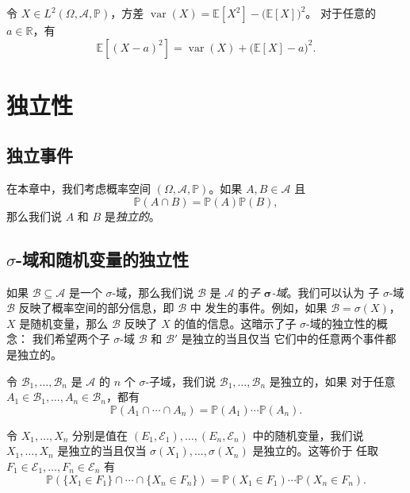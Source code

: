 \documentclass[fontset=none]{Notes}
\DeclareMathOperator\var{var}
\begin{document}
\begin{proposition}
  令 $X\in L^2(\Omega, \mathcal{A},\mathbb{P})$，方差
  $\var(X)=\mathbb{E}[X^2]-\bigl(\mathbb{E}[X]\bigr)^2$。
  对于任意的 $a\in \mathbb{R}$，有
  \[
    \mathbb{E}[(X-a)^2]=\var(X)+\bigl(\mathbb{E}[X]-a\bigr)  ^2.
  \]
\end{proposition}



\chapter{独立性}

\section{独立事件}

在本章中，我们考虑概率空间 $(\Omega,\mathcal{A},\mathbb{P})$。如果 
$A,B\in \mathcal{A}$ 且
\[
  \mathbb{P}(A\cap B)=\mathbb{P}(A)\mathbb{P}(B),  
\]
那么我们说 $A$ 和 $B$ 是\emph{独立的}。

\section{$\sigma$-域和随机变量的独立性}

如果 $\mathcal{B}\subseteq \mathcal{A}$ 是一个 $\sigma$-域，那么我们说
$\mathcal{B}$ 是 $\mathcal{A}$ 的\emph{子 $\mathbold{\sigma}$-域}。我们可以认为
子 $\sigma$-域 $\mathcal{B}$ 反映了概率空间的部分信息，即 $\mathcal{B}$ 中
发生的事件。例如，如果 $\mathcal{B}=\sigma(X)$，$X$ 是随机变量，那么
$\mathcal{B}$ 反映了 $X$ 的值的信息。这暗示了子 $\sigma$-域的独立性的概念：
我们希望两个子 $\sigma$-域 $\mathcal{B}$ 和 $\mathcal{B}'$ 是独立的当且仅当
它们中的任意两个事件都是独立的。

\begin{definition}
  令 $\mathcal{B}_1,\dots,\mathcal{B}_n$ 是 $\mathcal{A}$ 的 $n$ 个
  $\sigma$-子域，我们说 $\mathcal{B}_1,\dots,\mathcal{B}_n$ 是独立的，如果
  对于任意 $A_1\in \mathcal{B}_1,\dots,A_n\in \mathcal{B}_n$，都有
  \[
    \mathbb{P}(A_1\cap\cdots\cap A_n)=\mathbb{P}(A_1)\cdots \mathbb{P}(A_n).  
  \]
\end{definition}

令 $X_1,\dots,X_n$ 分别是值在 $(E_1,\mathcal{E}_1),\dots,(E_n,\mathcal{E}_n)$
中的随机变量，我们说 $X_1,\dots,X_n$ 是独立的当且仅当
$\sigma(X_1),\dots,\sigma(X_n)$ 是独立的。这等价于
任取 $F_1\in \mathcal{E}_1,\dots,F_n\in \mathcal{E}_n$ 有
\[
  \mathbb{P}(\{X_1\in F_1\}\cap\cdots\cap\{X_n\in F_n\})  
  =\mathbb{P}(X_1\in F_1)\cdots \mathbb{P}(X_n\in F_n).
\]
\end{document}
